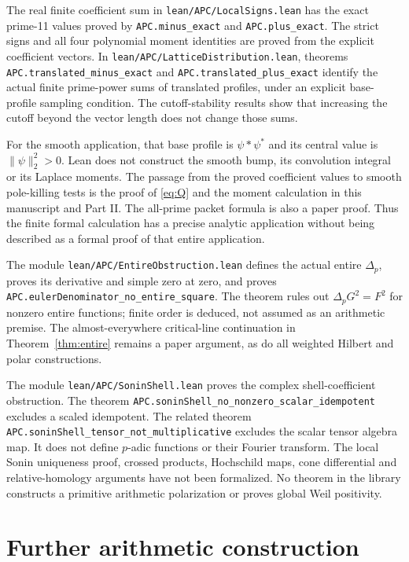 \documentclass[11pt,letterpaper]{article}
\theoremstyle{definition}
\theoremstyle{remark}
\begin{document}
The real finite coefficient sum in
\nolinkurl{lean/APC/LocalSigns.lean} has the exact prime-11
values proved by \nolinkurl{APC.minus_exact} and
\nolinkurl{APC.plus_exact}. The strict signs and all four
polynomial moment identities are proved from the explicit
coefficient vectors. In
\nolinkurl{lean/APC/LatticeDistribution.lean}, theorems
\nolinkurl{APC.translated_minus_exact} and
\nolinkurl{APC.translated_plus_exact} identify the actual finite
prime-power sums of translated profiles, under an explicit
base-profile sampling condition. The cutoff-stability results
show that increasing the cutoff beyond the vector length does
not change those sums.

For the smooth application, that base profile is
$\psi*\psi^*$ and its central value is $\|\psi\|_2^2>0$.
Lean does not construct the smooth bump, its convolution
integral or its Laplace moments. The passage from the proved
coefficient values to smooth pole-killing tests is the proof
of \eqref{eq:Q} and the moment calculation in this manuscript
and Part II. The all-prime packet formula is also a paper
proof. Thus the finite formal calculation has a precise
analytic application without being described as a formal
proof of that entire application.

The module \nolinkurl{lean/APC/EntireObstruction.lean}
defines the actual entire $\Delta_p$, proves its derivative
and simple zero at zero, and proves
\nolinkurl{APC.eulerDenominator_no_entire_square}.
The theorem rules out $\Delta_pG^2=F^2$ for nonzero entire
functions; finite order is deduced, not assumed as an
arithmetic premise. The almost-everywhere critical-line
continuation in Theorem~\ref{thm:entire} remains a paper
argument, as do all weighted Hilbert and polar constructions.

The module \nolinkurl{lean/APC/SoninShell.lean} proves the
complex shell-coefficient obstruction. The theorem
\nolinkurl{APC.soninShell_no_nonzero_scalar_idempotent}
excludes a scaled idempotent. The related theorem
\nolinkurl{APC.soninShell_tensor_not_multiplicative}
excludes the scalar tensor algebra map.
It does not define $p$-adic functions or their Fourier
transform. The local Sonin uniqueness proof, crossed products,
Hochschild maps, cone differential and relative-homology
arguments have not been formalized. No theorem in the library
constructs a primitive arithmetic polarization or proves
global Weil positivity.

\section{Further arithmetic construction}
\end{document}
